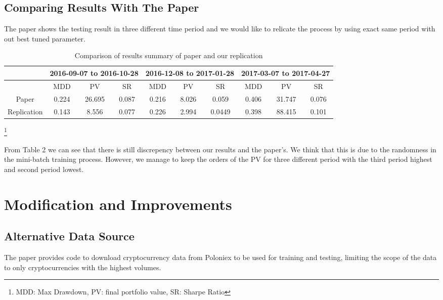 \documentclass[11pt]{paper}
\begin{document}
		\subsection{Comparing Results With The Paper}
		The paper shows the testing result in three different time period and we would like to relicate the process by using exact same period with out best tuned parameter. 
		\begin{table}[h]
\begin{tabular}{|c|c|c|c|c|c|c|c|c|c|}
\hline
            & \multicolumn{3}{c|}{2016-09-07 to 2016-10-28} & \multicolumn{3}{c|}{2016-12-08 to 2017-01-28} & \multicolumn{3}{c|}{2017-03-07 to 2017-04-27} \\ \hline
            & MDD    & PV        & SR    & MDD     & PV       & SR    & MDD    & PV        & SR    \\ \hline
Paper       & 0.224           & 26.695    & 0.087           & 0.216            & 8.026    & 0.059           & 0.406           & 31.747    & 0.076           \\ \hline
Replication & 0.143           & 8.556     & 0.077           & 0.226            & 2.994    & 0.0449          & 0.398           & 88.415    & 0.101           \\ \hline
\end{tabular}
\caption{Comparison of results summary of paper and our replication}
\end{table}
\footnote[1]{MDD: Max Drawdown, PV: final portfolio value, SR: Sharpe Ratio}
	
	From Table 2 we can see that there is still discrepency between our results and the paper's. We think that this is due to the randomness in the mini-batch training process. However, we manage to keep the orders of the PV for three different period with the third period highest and second period lowest.



	


	\section{Modification and Improvements}
		\subsection{Alternative Data Source}
		The paper provides code to download cryptocurrency data from Poloniex to be used for training and testing, limiting the scope of the data to only cryptocurrencies with the highest volumes.
\end{document}
